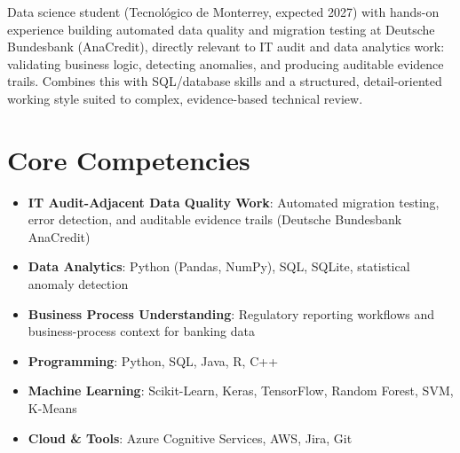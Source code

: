 \documentclass[11pt,a4paper,sans]{moderncv}
\begin{document}
\makecvtitle


\vspace{6pt}
\small{Data science student (Tecnológico de Monterrey, expected 2027) with hands-on experience building automated data quality and migration testing at Deutsche Bundesbank (AnaCredit), directly relevant to IT audit and data analytics work: validating business logic, detecting anomalies, and producing auditable evidence trails. Combines this with SQL/database skills and a structured, detail-oriented working style suited to complex, evidence-based technical review.}


\section{Core Competencies}
\vspace{1pt}
\begin{itemize}

\item \textbf{IT Audit-Adjacent Data Quality Work}: Automated migration testing, error detection, and auditable evidence trails (Deutsche Bundesbank AnaCredit)

\item \textbf{Data Analytics}: Python (Pandas, NumPy), SQL, SQLite, statistical anomaly detection

\item \textbf{Business Process Understanding}: Regulatory reporting workflows and business-process context for banking data

\item \textbf{Programming}: Python, SQL, Java, R, C++

\item \textbf{Machine Learning}: Scikit-Learn, Keras, TensorFlow, Random Forest, SVM, K-Means

\item \textbf{Cloud \& Tools}: Azure Cognitive Services, AWS, Jira, Git

\end{itemize}

\end{document}
